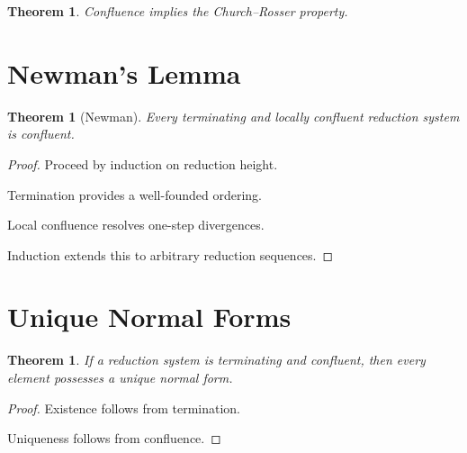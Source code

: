 \documentclass[11pt]{book}
\numberwithin{equation}{chapter}
\theoremstyle{definition}
\theoremstyle{plain}
\newtheorem{theorem}[definition]{Theorem}
\begin{document}

\begin{theorem}

Confluence implies the Church--Rosser property.

\end{theorem}


\section{Newman's Lemma}

\begin{theorem}[Newman]

Every terminating and locally confluent reduction system is confluent.

\end{theorem}

\begin{proof}

Proceed by induction on reduction height.

Termination provides a well-founded ordering.

Local confluence resolves one-step divergences.

Induction extends this to arbitrary reduction sequences.

\end{proof}


\section{Unique Normal Forms}

\begin{theorem}

If a reduction system is terminating and confluent, then every element
possesses a unique normal form.

\end{theorem}

\begin{proof}

Existence follows from termination.

Uniqueness follows from confluence.

\end{proof}

\end{document}
